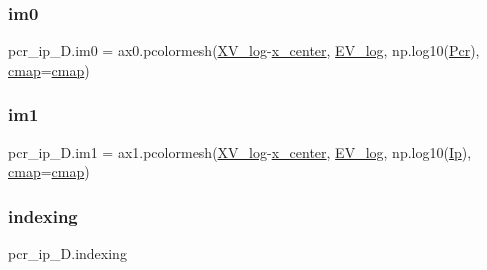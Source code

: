 \mbox{\label{namespacepcr__ip__2D_a8e31912426f0e0182311460d868d1957}} 
\subsubsection{\texorpdfstring{im0}{im0}}
{\footnotesize\ttfamily pcr\+\_\+ip\+\_\+D.\+im0 = ax0.\+pcolormesh(\hyperlink{namespacepcr__ip__2D_ac8c102166cd03830d33b1eac315a74f5}{X\+V\+\_\+log}-\/\hyperlink{namespacepcr__ip__2D_a5f81ee95156f4676e4e6bd159c2ec79e}{x\+\_\+center}, \hyperlink{namespacepcr__ip__2D_af397aa7c591bd630fd12f918acd003ea}{E\+V\+\_\+log}, np.\+log10(\hyperlink{namespacepcr__ip__2D_a0709cd4d093eccbf25a46d0b15d0dd86}{Pcr}), \hyperlink{namespacepcr__ip__2D_a2df3b02154af535c827d59c9a7a24b9e}{cmap}=\hyperlink{namespacepcr__ip__2D_a2df3b02154af535c827d59c9a7a24b9e}{cmap})}

\mbox{\label{namespacepcr__ip__2D_aade1cb6ea3f020febc6029787ea8d723}} 
\subsubsection{\texorpdfstring{im1}{im1}}
{\footnotesize\ttfamily pcr\+\_\+ip\+\_\+D.\+im1 = ax1.\+pcolormesh(\hyperlink{namespacepcr__ip__2D_ac8c102166cd03830d33b1eac315a74f5}{X\+V\+\_\+log}-\/\hyperlink{namespacepcr__ip__2D_a5f81ee95156f4676e4e6bd159c2ec79e}{x\+\_\+center}, \hyperlink{namespacepcr__ip__2D_af397aa7c591bd630fd12f918acd003ea}{E\+V\+\_\+log}, np.\+log10(\hyperlink{namespacepcr__ip__2D_a585cc4fbd898d4face7a2b37f0ad6636}{Ip}), \hyperlink{namespacepcr__ip__2D_a2df3b02154af535c827d59c9a7a24b9e}{cmap}=\hyperlink{namespacepcr__ip__2D_a2df3b02154af535c827d59c9a7a24b9e}{cmap})}

\mbox{\label{namespacepcr__ip__2D_adccbd43c0c9257002ea7f46bce162d3c}} 
\subsubsection{\texorpdfstring{indexing}{indexing}}
{\footnotesize\ttfamily pcr\+\_\+ip\+\_\+D.\+indexing}

